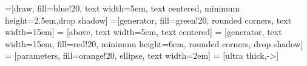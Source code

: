 
% 


=[draw, fill=blue!20, text width=5em, 
    text centered, minimum height=2.5em,drop shadow]
=[generator, fill=green!20, rounded corners, text width=15em]
 = [above, text width=5em, text centered]
 = [generator, text width=15em, fill=red!20, 
    minimum height=6em, rounded corners, drop shadow]
 = [parameters, fill=orange!20, ellipse, text width=2em]
 = [ultra thick,->]

\def\blockdist{2.3}
\def\edgedist{2.5}

